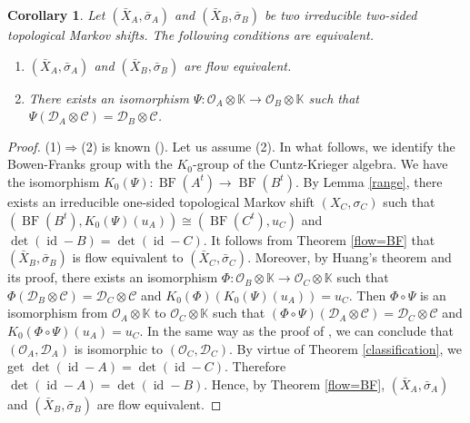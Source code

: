 \documentclass[11pt]{article}
\newtheorem{corollary}[theorem]{Corollary}
\theoremstyle{definition}
\numberwithin{equation}{section}
\newcommand{\BF}{\operatorname{BF}}
\newcommand{\id}{\operatorname{id}}
\newcommand{\K}{\mathbb{K}}
\begin{document}
\begin{corollary}\label{fe=cartaniso}
Let $(\bar X_A,\bar\sigma_A)$ and $(\bar X_B,\bar\sigma_B)$ be 
two irreducible two-sided topological Markov shifts. 
The following conditions are equivalent. 
\begin{enumerate}
\item $(\bar X_A,\bar\sigma_A)$ and $(\bar X_B,\bar\sigma_B)$ are 
flow equivalent. 
\item There exists an isomorphism 
$\Psi:\mathcal{O}_A\otimes\K\to\mathcal{O}_B\otimes\K$ such that 
$\Psi(\mathcal{D}_A\otimes\mathcal{C})=\mathcal{D}_B\otimes\mathcal{C}$. 
\end{enumerate}
\end{corollary}
\begin{proof}
(1)$\Rightarrow$(2) is known (\cite[Theorem 4.1]{CK80Invent}). 
Let us assume (2). 
In what follows, we identify the Bowen-Franks group 
with the $K_0$-group of the Cuntz-Krieger algebra. 
We have the isomorphism $K_0(\Psi):\BF(A^t)\to\BF(B^t)$. 
By Lemma \ref{range}, there exists 
an irreducible one-sided topological Markov shift $(X_C,\sigma_C)$ 
such that $(\BF(B^t),K_0(\Psi)(u_A))\cong(\BF(C^t),u_C)$ and 
$\det(\id-B)=\det(\id-C)$. 
It follows from Theorem \ref{flow=BF} that 
$(\bar X_B,\bar\sigma_B)$ is flow equivalent to $(\bar X_C,\bar\sigma_C)$. 
Moreover, by Huang's theorem \cite[Theorem 2.15]{H94ETDS} and its proof, 
there exists an isomorphism 
$\Phi:\mathcal{O}_B\otimes\K\to\mathcal{O}_C\otimes\K$ such that 
$\Phi(\mathcal{D}_B\otimes\mathcal{C})=\mathcal{D}_C\otimes\mathcal{C}$ and 
$K_0(\Phi)(K_0(\Psi)(u_A))=u_C$. 
Then $\Phi\circ\Psi$ is an isomorphism 
from $\mathcal{O}_A\otimes\K$ to $\mathcal{O}_C\otimes\K$ such that 
$(\Phi\circ\Psi)(\mathcal{D}_A\otimes\mathcal{C})
=\mathcal{D}_C\otimes\mathcal{C}$ and $K_0(\Phi\circ\Psi)(u_A)=u_C$. 
In the same way as the proof of \cite[Theorem 4.1]{Matsumoto13PAMS}, 
we can conclude that $(\mathcal{O}_A,\mathcal{D}_A)$ is 
isomorphic to $(\mathcal{O}_C,\mathcal{D}_C)$. 
By virtue of Theorem \ref{classification}, 
we get $\det(\id-A)=\det(\id-C)$. 
Therefore $\det(\id-A)=\det(\id-B)$. 
Hence, by Theorem \ref{flow=BF}, 
$(\bar X_A,\bar\sigma_A)$ and $(\bar X_B,\bar\sigma_B)$ are flow equivalent. 
\end{proof}
\end{document}
